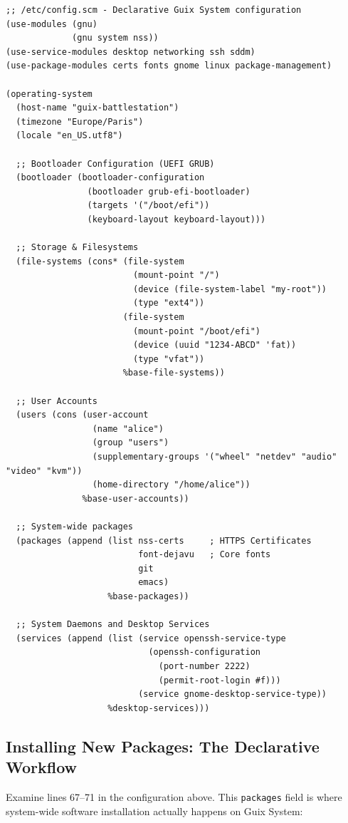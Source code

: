 \begin{lstlisting}[style=guixscheme]
;; /etc/config.scm - Declarative Guix System configuration
(use-modules (gnu)
             (gnu system nss))
(use-service-modules desktop networking ssh sddm)
(use-package-modules certs fonts gnome linux package-management)

(operating-system
  (host-name "guix-battlestation")
  (timezone "Europe/Paris")
  (locale "en_US.utf8")

  ;; Bootloader Configuration (UEFI GRUB)
  (bootloader (bootloader-configuration
                (bootloader grub-efi-bootloader)
                (targets '("/boot/efi"))
                (keyboard-layout keyboard-layout)))

  ;; Storage & Filesystems
  (file-systems (cons* (file-system
                         (mount-point "/")
                         (device (file-system-label "my-root"))
                         (type "ext4"))
                       (file-system
                         (mount-point "/boot/efi")
                         (device (uuid "1234-ABCD" 'fat))
                         (type "vfat"))
                       %base-file-systems))

  ;; User Accounts
  (users (cons (user-account
                 (name "alice")
                 (group "users")
                 (supplementary-groups '("wheel" "netdev" "audio" "video" "kvm"))
                 (home-directory "/home/alice"))
               %base-user-accounts))

  ;; System-wide packages
  (packages (append (list nss-certs     ; HTTPS Certificates
                          font-dejavu   ; Core fonts
                          git
                          emacs)
                    %base-packages))

  ;; System Daemons and Desktop Services
  (services (append (list (service openssh-service-type
                            (openssh-configuration
                              (port-number 2222)
                              (permit-root-login #f)))
                          (service gnome-desktop-service-type))
                    %desktop-services)))
\end{lstlisting}

\subsection{Installing New Packages: The Declarative Workflow}

Examine lines 67--71 in the configuration above. This \texttt{packages} field is where system-wide software installation actually happens on Guix System:

